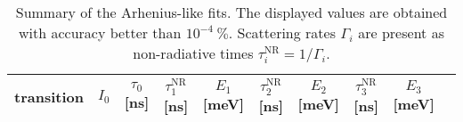 \begin{table}
	\centering
	\caption{Summary of the Arhenius-like fits. The displayed values are obtained with accuracy better than $10^{-4}~\%$. Scattering rates $\Gamma_i$ are present as non-radiative times $\tau_i^\mathrm{NR}=1/\Gamma_i$. }
	\begin{tabularx}{1.1\textwidth}{cCCccccccc}
		\toprule
		
		
		
		
		
			transition & $I_0$ & $\tau_0$ [ns]& $\tau_1^\mathrm{NR}$ [ns]& $E_1$ [meV]& $\tau_2^\mathrm{NR}$ [ns]& $E_2$ [meV]& $\tau_3^\mathrm{NR}$ [ns]& $E_3$ [meV]\\ 	
			\midrule
			\midrule
			

\end{tabularx}
\end{table}
